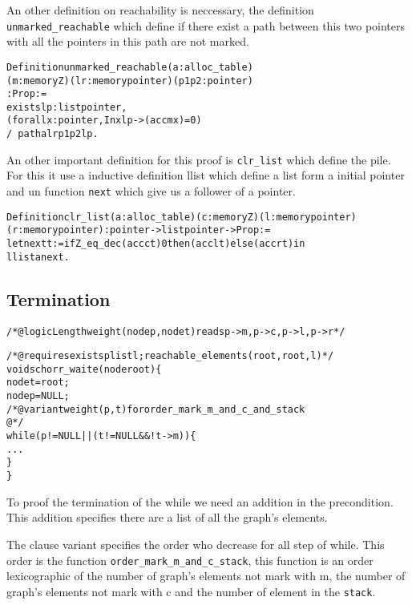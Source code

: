 An other definition on reachability is neccessary, the definition
 \texttt{unmarked\_reachable} which define if there exist a path
 between this two pointers with all the pointers in this path are not marked.
\begin{alltt}
\begin{slshape}
Definition unmarked_reachable (a: alloc_table) 
  (m:memory Z) (l r: memory pointer) (p1 p2:pointer) 
  : Prop :=
  exists lp : list pointer, 
    (forall x : pointer, In x lp -> (acc m x) = 0 ) 
    /\ path a l r p1 p2 lp.
\end{slshape}
\end{alltt}


An other important definition for this proof is \texttt{clr\_list}
which define the pile. For this it use a inductive definition llist
which define a list form a initial pointer and un function
\texttt{next} which give us a follower of a pointer.  
\begin{alltt}
\begin{slshape}
Definition clr_list (a: alloc_table)  (c:memory Z) (l: memory pointer)
(r: memory pointer) : pointer ->list pointer-> Prop :=
let next t := if Z_eq_dec (acc c t) 0 then (acc l t) else (acc r t) in
llist a next .
\end{slshape}
\end{alltt}

\subsection{Termination}

\begin{alltt}
/*@ logic Length weight(node p , node t) reads p->m,p->c,p->l,p->r*/

/*@ requires \bs{}exists plist l; reachable_elements(root,root,l) */
void schorr_waite(node root) \{
  node t = root;
  node p = NULL;
  /*@variant weight(p,t) for order_mark_m_and_c_and_stack 
    @*/
  while (p != NULL || (t != NULL && ! t->m)) \{
   ...
  \}
\}
\end{alltt}

To proof the termination of the while we need an addition in the
precondition. This addition specifies there are a list of all the
graph's elements.

The clause variant specifies the order who decrease for all step of
while. This order is the function \verb|order_mark_m_and_c_stack|, this
function is an order lexicographic of the number of graph's elements
not mark with m, the number of graph's elements not mark with c and the number
of element in the \texttt{stack}. 





